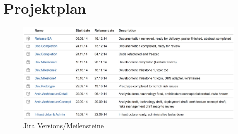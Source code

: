 \chapter*{Projektplan}
	

	\begin{figure}[H]
		\includegraphics[width=\textwidth]{projectPlan/media/img/jiraVersions.jpg}
		\centering
		\caption{Jira Versions/Meilensteine}
		\label{fig:jiraVersions}
	\end{figure}